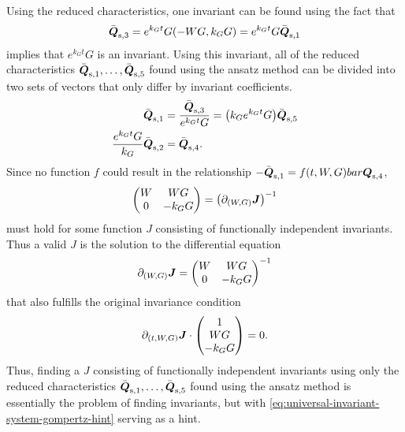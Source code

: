 Using the reduced characteristics, one invariant can be found using the fact that
\begin{equation*}
  \bar{\vect{Q}}_{\text{s},3} = e^{k_{G} t} G \left(-W G, k_G G\right) = e^{k_{G} t} G \bar{\vect{Q}}_{\text{s},1}
\end{equation*}
implies that \(e^{k_{G} t} G\) is an invariant.
Using this invariant, all of the reduced characteristics \(\bar{\boldsymbol{Q}}_{\text{s},1}, \dots, \bar{\boldsymbol{Q}}_{\text{s},5}\) found using the ansatz method can be divided into two sets of vectors that only differ by invariant coefficients.
\begin{align*}
  \bar{\vect{Q}}_{\text{s},1} &= \frac{\bar{\vect{Q}}_{\text{s},3}}{e^{k_{G} t} G} = \left(k_G e^{k_{G} t} G\right) \bar{\vect{Q}}_{\text{s},5} \\
  \frac{e^{k_{G} t} G}{k_G} \bar{\vect{Q}}_{\text{s},2} &= \bar{\vect{Q}}_{\text{s},4}.
\end{align*}
Since no function \(f\) could result in the relationship \(-\bar{\boldsymbol{Q}}_{\text{s},1} = f(t, W, G) bar{\boldsymbol{Q}}_{\text{s},4}\),
\begin{equation*}
  \begin{pmatrix}
    W & W G \\
    0 & -k_G G
  \end{pmatrix}
  = \left(\partial_{(W, G)} \vect{J}\right)^{-1}
\end{equation*}
must hold for some function \(J\) consisting of functionally independent invariants.
Thus a valid \(J\) is the solution to the differential equation
\begin{equation} \label{eq:universal-invariant-system-gompertz-hint}
  \partial_{(W, G)} \boldsymbol{J} =
  \begin{pmatrix}
    W & W G \\
    0 & -k_G G
  \end{pmatrix}^{-1}
\end{equation}
that also fulfills the original invariance condition
\begin{equation*}
  \partial_{(t, W, G)} \boldsymbol{J} \cdot
  \begin{pmatrix}
    1 \\
    W G \\
    -k_G G
  \end{pmatrix}
  = 0.
\end{equation*}
Thus, finding a \(J\) consisting of functionally independent invariants using only the reduced characteristics \(\bar{\boldsymbol{Q}}_{\text{s},1}, \dots, \bar{\boldsymbol{Q}}_{\text{s},5}\) found using the ansatz method is essentially the problem of finding invariants, but with \cref{eq:universal-invariant-system-gompertz-hint} serving as a hint.
